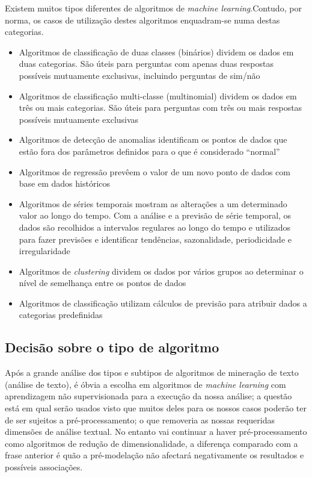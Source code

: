 Existem muitos tipos diferentes de algoritmos de \textit{machine learning}.Contudo, por norma, os casos de utilização destes algoritmos enquadram-se numa destas categorias.
\begin{itemize}
  \item Algoritmos de classificação de duas classes (binários) dividem os dados em duas categorias. São úteis para perguntas com apenas duas respostas possíveis mutuamente exclusivas, incluindo perguntas de sim/não
  \item Algoritmos de classificação multi-classe (multinomial) dividem os dados em três ou mais categorias. São úteis para perguntas com três ou mais respostas possíveis mutuamente exclusivas
  \item Algoritmos de detecção de anomalias identificam os pontos de dados que estão fora dos parâmetros definidos para o que é considerado ``normal''
  \item Algoritmos de regressão prevêem o valor de um novo ponto de dados com base em dados históricos
  \item Algoritmos de séries temporais mostram as alterações a um determinado valor ao longo do tempo. Com a análise e a previsão de série temporal, os dados são recolhidos a intervalos regulares ao longo do tempo e utilizados para fazer previsões e identificar tendências, sazonalidade, periodicidade e irregularidade
  \item Algoritmos de \textit{clustering} dividem os dados por vários grupos ao determinar o nível de semelhança entre os pontos de dados
  \item Algoritmos de classificação utilizam cálculos de previsão para atribuir dados a categorias predefinidas
\end{itemize}

\subsection{Decisão sobre o tipo de algoritmo}

Após a grande análise dos tipos e subtipos de algoritmos de mineração de texto (análise de texto), é óbvia a escolha em algoritmos de \textit{machine learning} com aprendizagem não supervisionada para a execução da nossa análise; a questão está em qual serão usados visto que muitos deles para os nossos casos poderão ter de ser sujeitos a pré-processamento; o que removeria as nossas requeridas dimensões de análise textual.
No entanto vai continuar a haver pré-processamento como algoritmos de redução de dimensionalidade, a diferença comparado com a frase anterior é quão a pré-modelação não afectará negativamente os resultados e possíveis associações.

